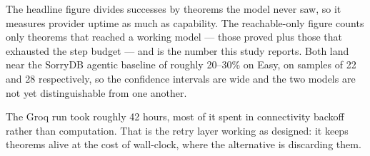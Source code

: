 The headline figure divides successes by theorems the model never saw, so it
measures provider uptime as much as capability. The reachable-only figure
counts only theorems that reached a working model --- those proved plus those
that exhausted the step budget --- and is the number this study reports. Both
land near the SorryDB agentic baseline of roughly 20--30\% on Easy, on samples
of 22 and 28 respectively, so the confidence intervals are wide and the two
models are not yet distinguishable from one another.

The Groq run took roughly 42 hours, most of it spent in connectivity backoff
rather than computation. That is the retry layer working as designed: it keeps
theorems alive at the cost of wall-clock, where the alternative is discarding
them.
